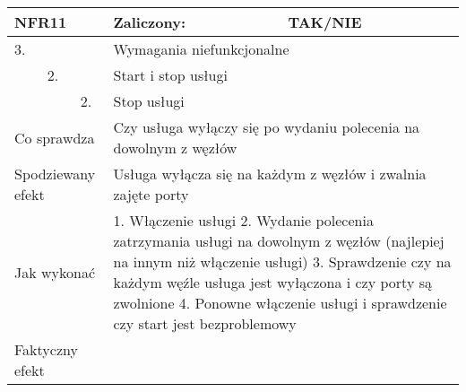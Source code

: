 \begin{tabular}{|p{20pt}|p{20pt}|p{20pt}|p{250pt}|p{60pt}|}
	\hline
	\multicolumn{3}{|p{70pt}|}{NFR11} & Zaliczony: & TAK/NIE \\ \hline
	3. & & & \multicolumn{2}{|p{310pt}|}{Wymagania niefunkcjonalne } \\ \hline
	& 2. & & \multicolumn{2}{|p{310pt}|}{Start i stop usługi } \\ \hline
	& & 2. & \multicolumn{2}{|p{310pt}|}{Stop usługi } \\ \hline
	\multicolumn{3}{|p{70pt}|}{Co sprawdza} & \multicolumn{2}{|p{310pt}|}{Czy usługa wyłączy się po wydaniu polecenia na dowolnym z węzłów} \\ \hline
	\multicolumn{3}{|p{70pt}|}{Spodziewany efekt} & \multicolumn{2}{|p{310pt}|}{Usługa wyłącza się na każdym z węzłów i zwalnia zajęte porty} \\ \hline
	\multicolumn{3}{|p{70pt}|}{Jak wykonać} & \multicolumn{2}{|p{310pt}|}{1. Włączenie usługi
2. Wydanie polecenia zatrzymania usługi na dowolnym z węzłów (najlepiej na innym niż włączenie usługi)
3. Sprawdzenie czy na każdym węźle usługa jest wyłączona i czy porty są zwolnione
4. Ponowne włączenie usługi i sprawdzenie czy start jest bezproblemowy} \\ \hline
	\multicolumn{3}{|p{70pt}|}{Faktyczny efekt} & \multicolumn{2}{|p{310pt}|}{} \\ \hline
\end{tabular}